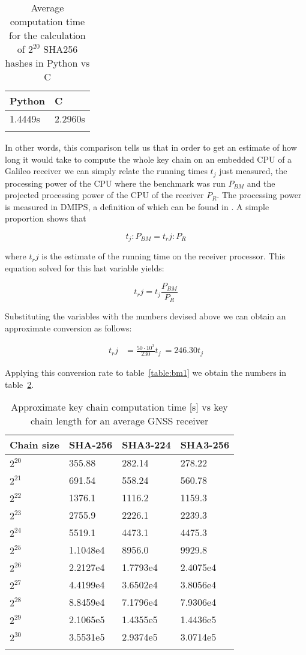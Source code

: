 



\begin{longtable}[]{@{}ll@{}}
\toprule
Python & C\tabularnewline
\midrule
\endhead
1.4449s & 2.2960s\tabularnewline
\bottomrule
\caption{Average computation time for the calculation of $2^{20}$ SHA256 hashes
in Python vs C}
\label{table:bm_c_python}
\end{longtable}

In other words, this comparison tells us that in order to get an estimate of how
long it would take to compute the whole key chain on an embedded CPU of a
Galileo receiver we can simply relate the running times $t_j$ just measured, the
processing power of the CPU where the benchmark was run $P_{BM}$ and the
projected processing power of the CPU of the receiver $P_R$. The processing
power is measured in DMIPS, a definition of which can be found in \cite{dmips}.
A simple proportion shows that

\begin{equation}
  t_j : P_{BM} = t_rj : P_R
\end{equation}

where $t_rj$ is the estimate of the running time on the receiver processor. This
equation solved for this last variable yields:

\[
  t_rj = t_j \frac{P_{BM}}{P_R}
\]

Substituting the variables with the numbers devised above we can obtain an
approximate conversion as follows:

\begin{equation}
  \begin{aligned}
  t_rj &= \frac{50 \cdot 10^3}{230} t_j\
        = 246.30 t_j
  \end{aligned}
\end{equation}

Applying this conversion rate to table~\ref{table:bm1} we obtain the numbers in
table~\ref{table:bm1_recv}.

\begin{longtable}[]{@{}llll@{}}
\toprule
Chain size & SHA-256 & SHA3-224 & SHA3-256\tabularnewline
\midrule
\endhead
$2^{20}$ & 355.88 & 282.14 & 278.22\tabularnewline
$2^{21}$ & 691.54 & 558.24 & 560.78\tabularnewline
$2^{22}$ & 1376.1 & 1116.2 & 1159.3\tabularnewline
$2^{23}$ & 2755.9 & 2226.1 & 2239.3\tabularnewline
$2^{24}$ & 5519.1 & 4473.1 & 4475.3\tabularnewline
$2^{25}$ & 1.1048e4 & 8956.0 & 9929.8\tabularnewline
$2^{26}$ & 2.2127e4 & 1.7793e4 & 2.4075e4\tabularnewline
$2^{27}$ & 4.4199e4 & 3.6502e4 & 3.8056e4\tabularnewline
$2^{28}$ & 8.8459e4 & 7.1796e4 & 7.9306e4\tabularnewline
$2^{29}$ & 2.1065e5 & 1.4355e5 & 1.4436e5\tabularnewline
$2^{30}$ & 3.5531e5 & 2.9374e5 & 3.0714e5\tabularnewline
\bottomrule
\caption{Approximate key chain computation time [s] vs key chain length for an
average GNSS receiver}
\label{table:bm1_recv}
\end{longtable}

